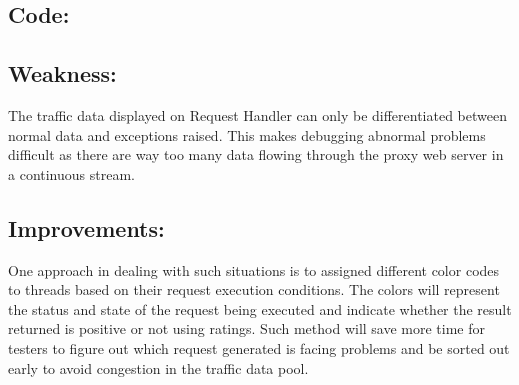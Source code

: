 \documentclass[12pt]{article}%
\begin{document}
\subsection*{Code:}

\subsection*{Weakness:}
The traffic data displayed on Request Handler can only be differentiated between normal data and exceptions raised. This makes debugging abnormal problems difficult as there are way too many data flowing through the proxy web server in a continuous stream. 
\subsection*{Improvements:}
One approach in dealing with such situations is to assigned different color codes to threads based on their request execution conditions. The colors will represent the status and state of the request being executed  and indicate whether the result returned is positive or not using ratings. Such method will save more time for testers to figure out which request generated is facing problems and be sorted out early to avoid congestion in the traffic data pool. 
\end{document}
